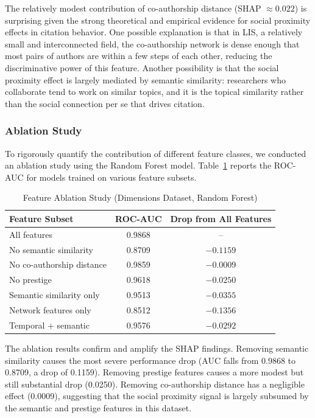 \documentclass[12pt,a4paper]{article}
\begin{document}
The relatively modest contribution of co-authorship distance (SHAP $\approx 0.022$) is surprising given the strong theoretical and empirical evidence for social proximity effects in citation behavior. One possible explanation is that in LIS, a relatively small and interconnected field, the co-authorship network is dense enough that most pairs of authors are within a few steps of each other, reducing the discriminative power of this feature. Another possibility is that the social proximity effect is largely mediated by semantic similarity: researchers who collaborate tend to work on similar topics, and it is the topical similarity rather than the social connection per se that drives citation.

\subsubsection{Ablation Study}

To rigorously quantify the contribution of different feature classes, we conducted an ablation study using the Random Forest model. Table~\ref{tab:dim_ablation} reports the ROC-AUC for models trained on various feature subsets.

\begin{table}[h!]
\centering
\caption{Feature Ablation Study (Dimensions Dataset, Random Forest)}
\label{tab:dim_ablation}
\begin{tabular}{lcc}
\toprule
\textbf{Feature Subset} & \textbf{ROC-AUC} & \textbf{Drop from All Features} \\
\midrule
All features & 0.9868 & -- \\
No semantic similarity & 0.8709 & $-0.1159$ \\
No co-authorship distance & 0.9859 & $-0.0009$ \\
No prestige & 0.9618 & $-0.0250$ \\
Semantic similarity only & 0.9513 & $-0.0355$ \\
Network features only & 0.8512 & $-0.1356$ \\
Temporal + semantic & 0.9576 & $-0.0292$ \\
\bottomrule
\end{tabular}
\end{table}

The ablation results confirm and amplify the SHAP findings. Removing semantic similarity causes the most severe performance drop (AUC falls from 0.9868 to 0.8709, a drop of 0.1159). Removing prestige features causes a more modest but still substantial drop (0.0250). Removing co-authorship distance has a negligible effect (0.0009), suggesting that the social proximity signal is largely subsumed by the semantic and prestige features in this dataset.
\end{document}
